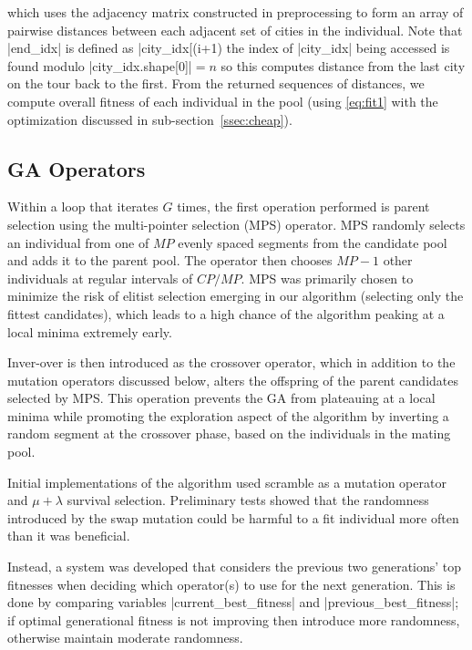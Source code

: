 {\small}

\noindent which uses the adjacency matrix constructed in preprocessing to form 
an array of pairwise distances between each adjacent set of cities in the 
individual. Note that |end_idx| is defined as |city_idx[(i+1) %
\ie the index of |city_idx| being accessed is found modulo 
|city_idx.shape[0]|${} = n$ so this computes distance from the last city on the 
tour back to the first. From the returned sequences of distances, we 
compute overall fitness of each individual in the pool (using \eqref{eq:fit1}
with the optimization discussed in sub-section~\ref{ssec:cheap}).

\subsection{GA Operators}
Within a loop that iterates $G$ times, the first operation performed is parent
selection using the multi-pointer selection (MPS) operator. MPS randomly 
selects an individual from one of $MP$ evenly spaced segments from the 
candidate pool and adds it to the parent pool. The operator then chooses
$MP-1$ other individuals at regular intervals of $CP/MP$. MPS was primarily 
chosen to minimize the risk of elitist selection emerging in our 
algorithm (\ie selecting only the fittest candidates), which leads to a 
high chance of the algorithm peaking at a local minima extremely early.

Inver-over is then introduced as the crossover operator, which in addition 
to the mutation operators discussed below, alters the offspring of the parent candidates 
selected by MPS. This operation prevents
the GA from plateauing at a local minima while promoting the exploration 
aspect of the algorithm by inverting a random segment at the crossover phase, 
based on the individuals in the mating pool.

Initial implementations of the algorithm used scramble as a mutation operator
and $\mu + \lambda$ survival selection. Preliminary tests showed that the 
randomness introduced by the swap mutation could be harmful to a fit 
individual more often than it was beneficial.  

Instead, a system was developed that considers the previous two generations'
top fitnesses when deciding which operator(s) to use for the next generation.
This is done by comparing variables |current_best_fitness| and 
|previous_best_fitness|; if optimal generational fitness is not improving
then introduce more randomness, otherwise maintain moderate randomness.

